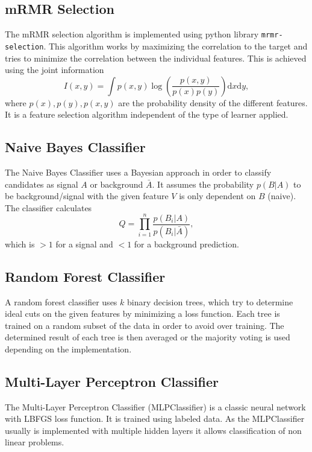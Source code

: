 \subsection{mRMR Selection}
\label{sec:mRmR}
The mRMR selection algorithm is implemented using python library \texttt{mrmr-selection}. This algorithm works by maximizing the correlation to the target and tries to minimize the correlation between the individual features. This is achieved using the joint information 
\begin{equation*}
	I(x,y) = \int p(x,y)\log\left(\frac{p(x,y)}{p(x)p(y)}\right)\mathrm{d}x\mathrm{d}y,
\end{equation*}
where $p(x),p(y),p(x,y)$ are the probability density of the different features. It is a feature selection algorithm independent of the type of learner applied.

\subsection{Naive Bayes Classifier}
The Naive Bayes Classifier uses a Bayesian approach in order to classify candidates as signal $A$ or background $\bar{A}$. It assumes the probability $p(B|A)$ to be background/signal with the given feature $V$ is only dependent on $B$ (naive). The classifier calculates
\begin{equation*}
	Q = \prod_{i=1}^{n} \frac{p(B_i|A)}{p(B_i|\bar{A})},
\end{equation*}
which is $> 1$ for a signal and $< 1$ for a background prediction.

\subsection{Random Forest Classifier}
A random forest classifier uses $k$ binary decision trees, which try to determine ideal cuts on the given features by minimizing a loss function. Each tree is trained on a random subset of the data in order to avoid over training. The determined result of each tree is then averaged or the majority voting is used depending on the implementation. 

\subsection{Multi-Layer Perceptron Classifier}
The Multi-Layer Perceptron Classifier (MLPClassifier) is a classic neural network with LBFGS loss function. It is trained using labeled data. As the MLPClassifier usually is implemented with multiple hidden layers it allows classification of non linear problems.

